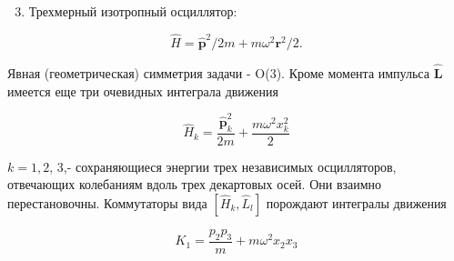 \documentclass[10pt]{article}
\begin{document}
\begin{enumerate}

  \setcounter{enumi}{2}

  \item Трехмерный изотропный осциллятор:

\end{enumerate}



\[

\hat{H}=\hat{\boldsymbol{p}}^{2} / 2 m+m \omega^{2} \boldsymbol{r}^{2} / 2 .

\]



Явная (геометрическая) симметрия задачи - O(3). Кроме момента импульса $\hat{\boldsymbol{L}}$ имеется еще три очевидных интеграла движения



\[

\hat{H}_{k}=\frac{\hat{\boldsymbol{p}}_{k}^{2}}{2 m}+\frac{m \omega^{2} x_{k}^{2}}{2}

\]



$k=1,2$, 3,- сохраняющиеся энергии трех независимых осцилляторов, отвечающих колебаниям вдоль трех декартовых осей. Они взаимно перестановочны. Коммутаторы вида $\left[\hat{H}_{k}, \hat{L}_{l}\right]$ порождают интегралы движения



\[

K_{1}=\frac{p_{2} p_{3}}{m}+m \omega^{2} x_{2} x_{3}

\]
\end{document}
